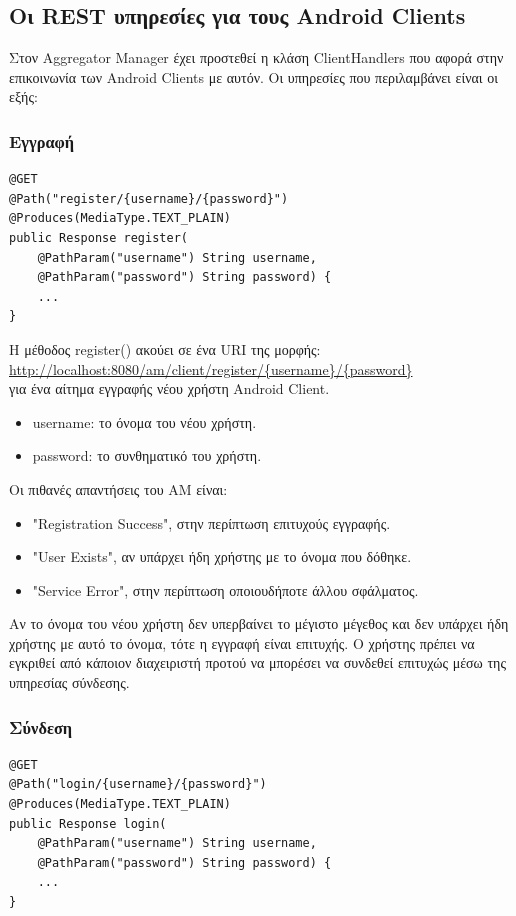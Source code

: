 \documentclass[a4paper,11pt]{article}
\begin{document}
\begin{sloppypar}
\newpage

\subsection{Οι REST υπηρεσίες για τους Android Clients}

Στον Aggregator Manager έχει προστεθεί η κλάση ClientHandlers που αφορά στην επικοινωνία των Android Clients με αυτόν. Οι υπηρεσίες που περιλαμβάνει είναι οι εξής:

\subsubsection{Εγγραφή}
\begin{lstlisting}
@GET
@Path("register/{username}/{password}")
@Produces(MediaType.TEXT_PLAIN)
public Response register(
    @PathParam("username") String username,
    @PathParam("password") String password) {
    ...
}
\end{lstlisting}
Η μέθοδος register() ακούει σε ένα URI της μορφής:
\\
\url{http://localhost:8080/am/client/register/{username}/{password}}
\\
για ένα αίτημα εγγραφής νέου χρήστη Android Client.
\begin{itemize}

\item username: το όνομα του νέου χρήστη.
\item password: το συνθηματικό του χρήστη.
\end{itemize}
Οι πιθανές απαντήσεις του AM είναι:
\begin{itemize}
\item "Registration Success", στην περίπτωση επιτυχούς εγγραφής.
\item "User Exists", αν υπάρχει ήδη χρήστης με το όνομα που δόθηκε.
\item "Service Error", στην περίπτωση οποιουδήποτε άλλου σφάλματος.
\end{itemize}
Αν το όνομα του νέου χρήστη δεν υπερβαίνει το μέγιστο μέγεθος και δεν υπάρχει ήδη χρήστης με αυτό το όνομα, τότε η εγγραφή είναι επιτυχής. Ο χρήστης πρέπει να εγκριθεί από κάποιον διαχειριστή προτού να μπορέσει να συνδεθεί επιτυχώς μέσω της υπηρεσίας σύνδεσης.

\subsubsection{Σύνδεση}
\begin{lstlisting}
@GET
@Path("login/{username}/{password}")
@Produces(MediaType.TEXT_PLAIN)
public Response login(
    @PathParam("username") String username,
    @PathParam("password") String password) {
    ...
}


\end{lstlisting}
\end{sloppypar}
\end{document}
